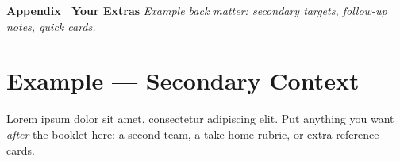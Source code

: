 
\clearpage

\begin{center}
    \vspace{0.35em}
    {\LARGE\bfseries\sffamily\color{primary} Appendix \textemdash\ Your Extras}
    \vspace{0.25em}
    {\small\itshape\color{muted} Example back matter: secondary targets, follow-up notes, quick cards.}
    \vspace{0.3em}
\end{center}

\vspace{0.6em}

\section{Example — Secondary Context}

\noindent Lorem ipsum dolor sit amet, consectetur adipiscing elit. Put anything you want \emph{after} the booklet here: a second team, a take-home rubric, or extra reference cards.

